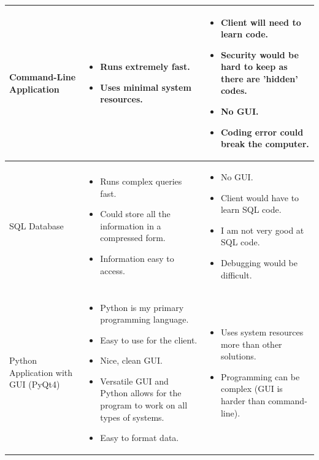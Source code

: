{{{\begin{center}
\begin{longtable}{|p{5cm}|p{5cm}|p{5cm}|}
Command-Line Application

& 
\begin{itemize}
\item Runs extremely fast.
\item Uses minimal system resources.
\end{itemize}

& 
\begin{itemize}
\item Client will need to learn code.
\item Security would be hard to keep as there are 'hidden' codes.
\item No GUI.
\item Coding error could break the computer. 
\end{itemize}
\\ \hline

SQL Database

& 
\begin{itemize}
\item Runs complex queries fast.
\item Could store all the information in a compressed form.
\item Information easy to access.
\end{itemize}

& 
\begin{itemize}
\item No GUI.
\item Client would have to learn SQL code.
\item I am not very good at SQL code.
\item Debugging would be difficult.
\end{itemize} \\ \hline

Python Application with GUI (PyQt4)

& 
\begin{itemize}
\item Python is my primary programming language. 
\item Easy to use for the client.
\item Nice, clean GUI.
\item Versatile GUI and Python allows for the program to work on all types of systems.
\item Easy to format data.
\end{itemize}

& 
\begin{itemize}
\item Uses system resources more than other solutions.
\item Programming can be complex (GUI is harder than command-line). 
\end{itemize}
\\ \hline




\end{longtable}
\end{center}}}}
